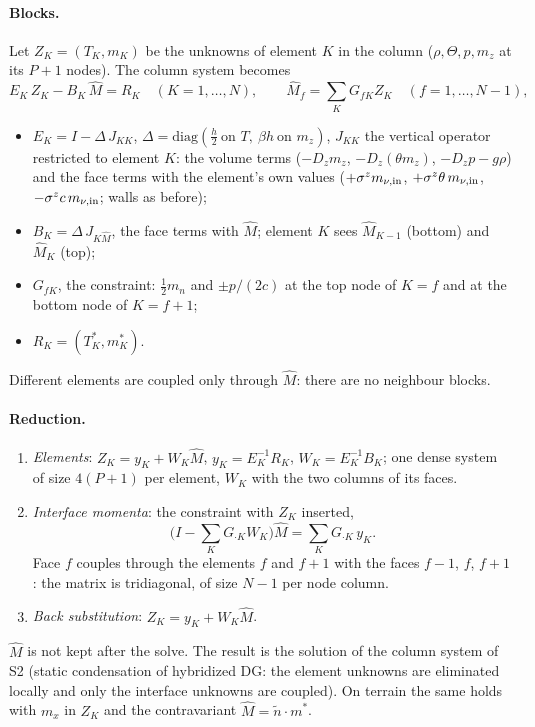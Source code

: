 \documentclass[11pt,a4paper]{article}
\begin{document}
\paragraph{Blocks.} Let $Z_K=(T_K,m_K)$ be the unknowns of element $K$ in the column ($\rho,\Theta,p,m_z$ at its $P+1$ nodes). The column system
becomes
\[
E_K\,Z_K-B_K\,\hat M=R_K\quad(K=1,\dots,N),\qquad \hat M_f=\sum_KG_{fK}Z_K\quad(f=1,\dots,N-1),
\]
\begin{itemize}
\item $E_K=I-\Delta\,J_{KK}$, $\Delta=\mathrm{diag}(\tfrac h2\ \text{on }T,\ \beta h\ \text{on }m_z)$, $J_{KK}$ the vertical operator restricted to element $K$:
  the volume terms ($-D_zm_z$, $-D_z(\theta m_z)$, $-D_zp-g\rho$) and the face terms with the element's own values ($+\sigma^zm_{\nu,\rm in}$,
  $+\sigma^z\theta\,m_{\nu,\rm in}$, $-\sigma^zc\,m_{\nu,\rm in}$; walls as before);
\item $B_K=\Delta\,J_{K\hat M}$, the face terms with $\hat M$; element $K$ sees $\hat M_{K-1}$ (bottom) and $\hat M_K$ (top);
\item $G_{fK}$, the constraint: $\tfrac12 m_n$ and $\pm p/(2c)$ at the top node of $K=f$ and at the bottom node of $K=f+1$;
\item $R_K=(T^*_K,m^*_K)$.
\end{itemize}
Different elements are coupled only through $\hat M$: there are no neighbour blocks.

\paragraph{Reduction.}
\begin{enumerate}
\item \emph{Elements}: $Z_K=y_K+W_K\hat M$, $y_K=E_K^{-1}R_K$, $W_K=E_K^{-1}B_K$; one dense system of size $4(P+1)$ per element, $W_K$ with the
  two columns of its faces.
\item \emph{Interface momenta}: the constraint with $Z_K$ inserted,
  \[
  \Big(I-\sum_KG_{\cdot K}W_K\Big)\hat M=\sum_KG_{\cdot K}\,y_K .
  \]
  Face $f$ couples through the elements $f$ and $f+1$ with the faces $f-1$, $f$, $f+1$: the matrix is tridiagonal, of size $N-1$ per node
  column.
\item \emph{Back substitution}: $Z_K=y_K+W_K\hat M$.
\end{enumerate}
$\hat M$ is not kept after the solve. The result is the solution of the column system of S2 (static condensation of hybridized DG:
the element unknowns are eliminated locally and only the interface unknowns are coupled). On terrain the same holds with $m_x$ in $Z_K$
and the contravariant $\hat M=\tilde n\cdot m^*$.
\end{document}
